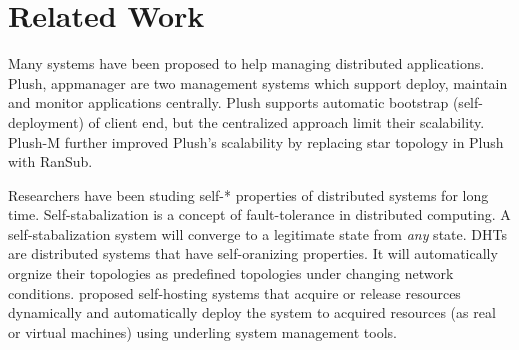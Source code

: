 \section{Related Work}
\label{sec:related}

Many systems have been proposed to help managing distributed
applications. Plush, appmanager are two management systems
which support deploy, maintain and monitor applications
centrally. Plush supports automatic bootstrap
(self-deployment) of client end, but the centralized
approach limit their scalability. Plush-M further improved
Plush's scalability by replacing star topology in Plush with
RanSub. 

Researchers have been studing self-* properties of
distributed systems for long time. Self-stabalization is a
concept of fault-tolerance in distributed computing. A
self-stabalization system will converge to a legitimate
state from \emph{any} state. DHTs are distributed systems
that have self-oranizing properties. It will automatically
orgnize their topologies as predefined topologies under
changing network conditions. \cite{self-host} proposed
self-hosting systems that acquire or release resources
dynamically and automatically deploy the system to acquired
resources (as real or virtual machines) using underling
system management tools.




